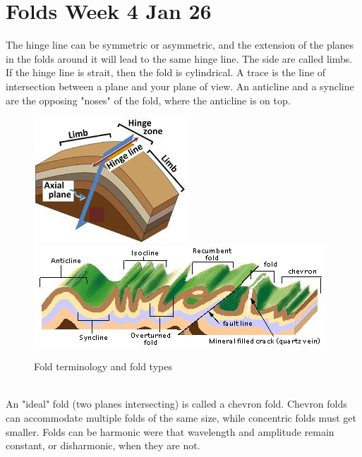 \documentclass[12pt,a4paper]{report}
\begin{document}
\section*{Folds Week 4 Jan 26}
The hinge line can be symmetric or asymmetric, and the extension of the planes in the folds around it will lead to the same hinge line.
The side are called limbs. If the hinge line is strait, then the fold is cylindrical.
A trace is the line of intersection between a plane and your plane of view.
An anticline and a syncline are the opposing "noses" of the fold, where the anticline is on top.
\begin{figure}[h]
  \includegraphics[scale=0.60]{folds-terminology.jpg}
  \includegraphics[scale=0.80]{fold-types.jpg}
  \centering
  \caption{Fold terminology and fold types}
\end{figure}\\
An "ideal" fold (two planes intersecting) is called a chevron fold.
Chevron folds can accommodate multiple folds of the same size, while concentric folds must get smaller.
Folds can be harmonic were that wavelength and amplitude remain constant, or disharmonic, when they are not.
\end{document}
